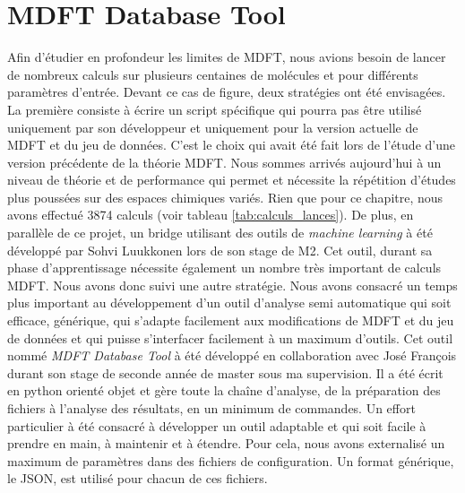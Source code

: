 \section{MDFT Database Tool}
Afin d'étudier en profondeur les limites de MDFT, nous avions besoin de lancer de nombreux calculs sur plusieurs centaines de molécules et pour différents paramètres d'entrée. Devant ce cas de figure, deux stratégies ont été envisagées. La première consiste à écrire un script spécifique qui pourra pas être utilisé uniquement par son développeur et uniquement pour la version actuelle de MDFT et du jeu de données. C'est le choix qui avait été fait lors de l'étude d'une version précédente de la théorie MDFT\cite{sergiievskyi_fast_2014, sergiievskyi_solvation_2015}. Nous sommes arrivés aujourd'hui à un niveau de théorie et de performance qui permet et nécessite la répétition d'études plus poussées sur des espaces chimiques variés. Rien que pour ce chapitre, nous avons effectué 3874 calculs (voir tableau \ref{tab:calculs_lances}). De plus, en parallèle de ce projet, un bridge utilisant des outils de \textit{machine learning} à été développé par Sohvi Luukkonen lors de son stage de M2. Cet outil, durant sa phase d'apprentissage nécessite également un nombre très important de calculs MDFT. Nous avons donc suivi une autre stratégie. Nous avons consacré un temps plus important au développement d'un outil d'analyse semi automatique qui soit efficace, générique, qui s'adapte facilement aux modifications de MDFT et du jeu de données et qui puisse s'interfacer facilement à un maximum d'outils. Cet outil nommé \textit{MDFT Database Tool} à été développé en collaboration avec José François durant son stage de seconde année de master sous ma supervision. Il a été écrit en python orienté objet et gère toute la chaîne d'analyse, de la préparation des fichiers à l'analyse des résultats, en un minimum de commandes. Un effort particulier à été consacré à développer un outil adaptable et qui soit facile à prendre en main, à maintenir et à étendre. Pour cela, nous avons externalisé un maximum de paramètres dans des fichiers de configuration. Un format générique, le JSON, est utilisé pour chacun de ces fichiers.




